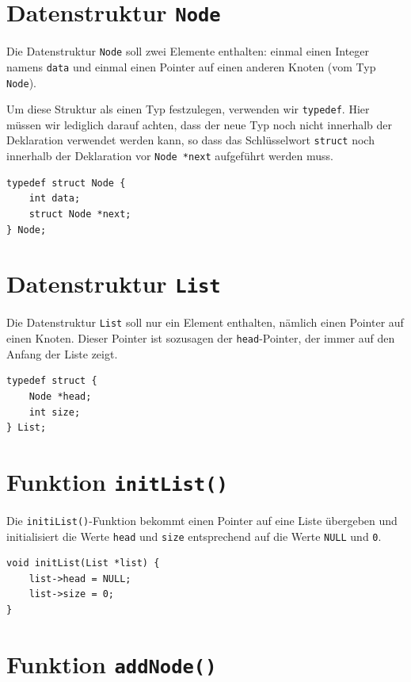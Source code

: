 \section*{Datenstruktur \texttt{Node}}

Die Datenstruktur \texttt{Node} soll zwei Elemente enthalten: einmal
einen Integer namens \texttt{data} und einmal einen Pointer auf einen
anderen Knoten (vom Typ \texttt{Node}).

Um diese Struktur als einen Typ festzulegen, verwenden wir
\texttt{typedef}. Hier müssen wir lediglich darauf achten, dass der neue
Typ noch nicht innerhalb der Deklaration verwendet werden kann, so dass das
Schlüsselwort \texttt{struct} noch innerhalb der Deklaration vor
\texttt{Node *next} aufgeführt werden muss.

\begin{verbatim}
typedef struct Node {
    int data;
    struct Node *next;
} Node;
\end{verbatim}

\section*{Datenstruktur \texttt{List}}

Die Datenstruktur \texttt{List} soll nur ein Element enthalten, nämlich
einen Pointer auf einen Knoten. Dieser Pointer ist sozusagen der
\texttt{head}-Pointer, der immer auf den Anfang der Liste zeigt.

\begin{verbatim}
typedef struct {
    Node *head;
    int size;
} List;
\end{verbatim}

\section*{Funktion \texttt{initList()}}

Die \texttt{initiList()}-Funktion bekommt einen Pointer auf eine Liste
übergeben und initialisiert die Werte \texttt{head} und
\texttt{size} entsprechend auf die Werte \texttt{NULL} und
\texttt{0}.

\begin{verbatim}
void initList(List *list) {
    list->head = NULL;
    list->size = 0;
}
\end{verbatim}

\section*{Funktion \texttt{addNode()}}

